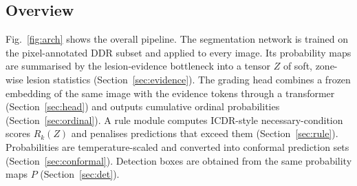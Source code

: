 \subsection{Overview}
Fig.~\ref{fig:arch} shows the overall pipeline. The segmentation network is trained on the pixel-annotated DDR subset and applied to every image. Its probability maps are summarised by the lesion-evidence bottleneck into a tensor $Z$ of soft, zone-wise lesion statistics (Section~\ref{sec:evidence}). The grading head combines a frozen embedding of the same image with the evidence tokens through a transformer (Section~\ref{sec:head}) and outputs cumulative ordinal probabilities (Section~\ref{sec:ordinal}). A rule module computes ICDR-style necessary-condition scores $R_k(Z)$ and penalises predictions that exceed them (Section~\ref{sec:rule}). Probabilities are temperature-scaled and converted into conformal prediction sets (Section~\ref{sec:conformal}). Detection boxes are obtained from the same probability maps $P$ (Section~\ref{sec:det}).


